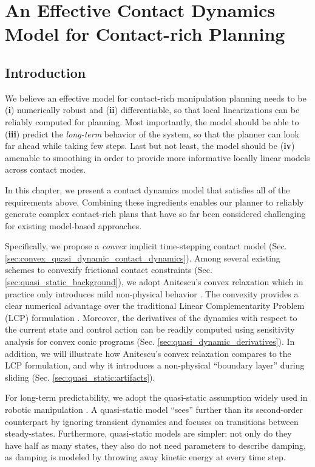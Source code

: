 \chapter{An Effective Contact Dynamics Model for Contact-rich Planning}
\label{chapter:quasi_static_dynamics}
\section{Introduction}
We believe an effective model for contact-rich manipulation planning needs to be 
(\textbf{i}) numerically robust
and (\textbf{ii}) differentiable, so that local linearizations can be reliably computed for planning. 
Most importantly, the model should be able to (\textbf{iii}) predict the \emph{long-term} behavior of the system, so that the planner can look far ahead while taking few steps.
Last but not least, the model should be (\textbf{iv}) amenable to smoothing in order to provide more informative locally linear models across contact modes. 

In this chapter, we present a contact dynamics model that satisfies all of the requirements above. Combining these ingredients enables our planner to reliably generate complex contact-rich plans that have so far been considered challenging for existing model-based approaches.

Specifically, we propose a \emph{convex} implicit time-stepping contact model (Sec. \ref{sec:convex_quasi_dynamic_contact_dynamics}). 
Among several existing schemes to convexify frictional contact constraints (Sec. \ref{sec:quasi_static_background}), we adopt Anitescu's convex relaxation \cite{anitescu2006optimization} which in practice only introduces mild non-physical behavior \cite{pang2021convex, castro2021unconstrained}. The convexity provides a clear numerical advantage over the traditional Linear Complementarity Problem (LCP) formulation \cite{anitescu1997formulating, stewart2000rigid}. Moreover, the derivatives of the dynamics with respect to the current state and control action can be readily computed using sensitivity analysis for convex conic programs \cite{agrawal2019differentiatingcone} (Sec. \ref{sec:quasi_dynamic_derivatives}). In addition, we will illustrate how Anitescu's convex relaxation compares to the LCP formulation, and why it introduces a non-physical ``boundary layer'' during sliding (Sec. \ref{sec:quasi_static:artifacts}).

For long-term predictability, we adopt the quasi-static assumption widely used in robotic manipulation \cite{mason2001mechanics, motioncones, aceituno2020global, cheng2021contact}. 
A quasi-static model ``sees'' further than its second-order counterpart by ignoring transient dynamics and focuses on transitions between steady-states. Furthermore, quasi-static models are simpler: not only do they have half as many states, they also do not need parameters to describe damping, as damping is modeled by throwing away kinetic energy at every time step.

